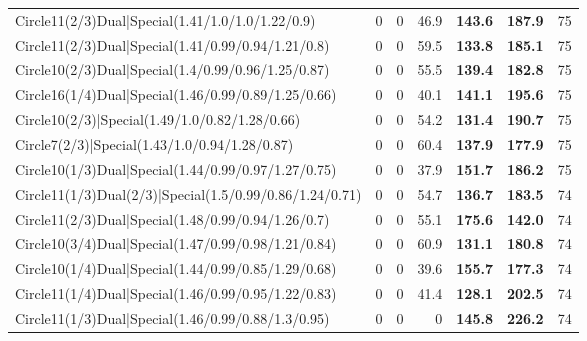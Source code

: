 \begin{tabular}{lrrrllr}
 Circle11(2/3)Dual|Special(1.41/1.0/1.0/1.22/0.9)               &          0   &            0   &          46.9 & \textbf{143.6} & \textbf{187.9} &           75 \\
 Circle11(2/3)Dual|Special(1.41/0.99/0.94/1.21/0.8)             &          0   &            0   &          59.5 & \textbf{133.8} & \textbf{185.1} &           75 \\
 Circle10(2/3)Dual|Special(1.4/0.99/0.96/1.25/0.87)             &          0   &            0   &          55.5 & \textbf{139.4} & \textbf{182.8} &           75 \\
 Circle16(1/4)Dual|Special(1.46/0.99/0.89/1.25/0.66)            &          0   &            0   &          40.1 & \textbf{141.1} & \textbf{195.6} &           75 \\
 Circle10(2/3)|Special(1.49/1.0/0.82/1.28/0.66)                 &          0   &            0   &          54.2 & \textbf{131.4} & \textbf{190.7} &           75 \\
 Circle7(2/3)|Special(1.43/1.0/0.94/1.28/0.87)                  &          0   &            0   &          60.4 & \textbf{137.9} & \textbf{177.9} &           75 \\
 Circle10(1/3)Dual|Special(1.44/0.99/0.97/1.27/0.75)            &          0   &            0   &          37.9 & \textbf{151.7} & \textbf{186.2} &           75 \\
 Circle11(1/3)Dual(2/3)|Special(1.5/0.99/0.86/1.24/0.71)        &          0   &            0   &          54.7 & \textbf{136.7} & \textbf{183.5} &           74 \\
 Circle11(2/3)Dual|Special(1.48/0.99/0.94/1.26/0.7)             &          0   &            0   &          55.1 & \textbf{175.6} & \textbf{142.0} &           74 \\
 Circle10(3/4)Dual|Special(1.47/0.99/0.98/1.21/0.84)            &          0   &            0   &          60.9 & \textbf{131.1} & \textbf{180.8} &           74 \\
 Circle10(1/4)Dual|Special(1.44/0.99/0.85/1.29/0.68)            &          0   &            0   &          39.6 & \textbf{155.7} & \textbf{177.3} &           74 \\
 Circle11(1/4)Dual|Special(1.46/0.99/0.95/1.22/0.83)            &          0   &            0   &          41.4 & \textbf{128.1} & \textbf{202.5} &           74 \\
 Circle11(1/3)Dual|Special(1.46/0.99/0.88/1.3/0.95)             &          0   &            0   &           0   & \textbf{145.8} & \textbf{226.2} &           74 \\

\end{tabular}

